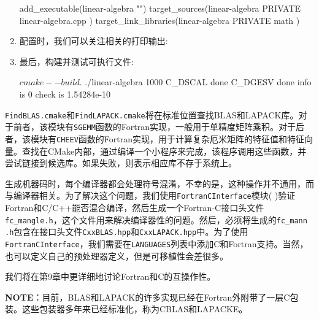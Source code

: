\begin{enumerate}
\begin{codebox}[cmake]
add_executable(linear-algebra "")
target_sources(linear-algebra
  PRIVATE
    linear-algebra.cpp
  )
target_link_libraries(linear-algebra
  PRIVATE
    math
  )
\end{codebox}

\item 配置时，我们可以关注相关的打印输出:


\item 最后，构建并测试可执行文件:

\begin{codebox}[shell]
$ cmake --build .
$ ./linear-algebra 1000
C_DSCAL done
C_DGESV done
info is 0
check is 1.54284e-10
\end{codebox}

\end{enumerate}


\texttt{FindBLAS.cmake}和\texttt{FindLAPACK.cmake}将在标准位置查找BLAS和LAPACK库。对于前者，该模块有\texttt{SGEMM}函数的Fortran实现，一般用于单精度矩阵乘积。对于后者，该模块有\texttt{CHEEV}函数的Fortran实现，用于计算复杂厄米矩阵的特征值和特征向量。查找在CMake内部，通过编译一个小程序来完成，该程序调用这些函数，并尝试链接到候选库。如果失败，则表示相应库不存于系统上。

生成机器码时，每个编译器都会处理符号混淆，不幸的是，这种操作并不通用，而与编译器相关。为了解决这个问题，我们使用\texttt{FortranCInterface}模块(  )验证Fortran和C/C++能否混合编译，然后生成一个Fortran-C接口头文件\texttt{fc\_mangle.h}，这个文件用来解决编译器性的问题。然后，必须将生成的\texttt{fc\_mann .h}包含在接口头文件\texttt{CxxBLAS.hpp}和\texttt{CxxLAPACK.hpp}中。为了使用\texttt{FortranCInterface}，我们需要在\texttt{LANGUAGES}列表中添加C和Fortran支持。当然，也可以定义自己的预处理器定义，但是可移植性会差很多。

我们将在第9章中更详细地讨论Fortran和C的互操作性。

\begin{myInfoBox}
\textbf{NOTE}：目前，BLAS和LAPACK的许多实现已经在Fortran外附带了一层C包装。这些包装器多年来已经标准化，称为CBLAS和LAPACKE。
\end{myInfoBox}


